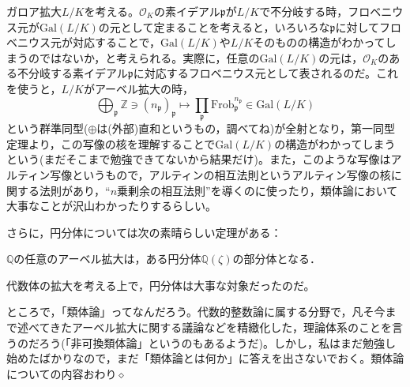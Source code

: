 ガロア拡大$L/K$を考える。$\mathcal{O}_K$の素イデアル$\mathfrak{p}$が$L/K$で不分岐する時，フロベニウス元が$\mathrm{Gal}(L/K)$の元として定まることを考えると，いろいろな$\mathfrak{p}$に対してフロベニウス元が対応することで，$\mathrm{Gal}(L/K)$や$L/K$そのものの構造がわかってしまうのではないか，と考えられる。実際に，任意の$\mathrm{Gal}(L/K)$の元は，$\mathcal{O}_K$のある不分岐する素イデアル$\mathfrak{p}$に対応するフロベニウス元として表されるのだ。これを使うと，$L/K$がアーベル拡大の時，\[
\bigoplus_{\mathfrak{p}}\mathds{Z}\ni (n_{\mathfrak{p}})_{\mathfrak{p}}\mapsto\prod_{\mathfrak{p}}\mathrm{Frob}_{\mathfrak{p}}^{n_{\mathfrak{p}}}\in\mathrm{Gal}(L/K)
\]という群準同型($\oplus$は(外部)直和というもの，調べてね)が全射となり，第一同型定理より，この写像の核を理解することで$\mathrm{Gal}(L/K)$の構造がわかってしまうという(まだそこまで勉強できてないから結果だけ)。また，このような写像はアルティン写像というもので，アルティンの相互法則というアルティン写像の核に関する法則があり，``$n$乗剰余の相互法則''を導くのに使ったり，類体論において大事なことが沢山わかったりするらしい。

さらに，円分体については次の素晴らしい定理がある：
\begin{thm}
    $\mathds{Q}$の任意のアーベル拡大は，ある円分体$\mathds{Q}(\zeta)$の部分体となる．
\end{thm}
代数体の拡大を考える上で，円分体は大事な対象だったのだ。

ところで，「類体論」ってなんだろう。代数的整数論に属する分野で，凡そ今まで述べてきたアーベル拡大に関する議論などを精緻化した，理論体系のことを言うのだろう(「非可換類体論」というのもあるようだ)。しかし，私はまだ勉強し始めたばかりなので，まだ「類体論とは何か」に答えを出さないでおく。類体論についての内容おわり$\diamond$








